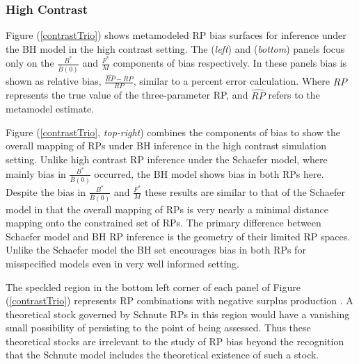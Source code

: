 \subsubsection{High Contrast \label{highConRes}}

%
Figure (\ref{contrastTrio}) shows metamodeled RP bias surfaces for inference
under the BH model in the high contrast setting. The (\emph{left}) and
(\emph{bottom}) panels focus only on the $\frac{B^*}{\bar B(0)}$ and
$\frac{F^*}{M}$ components of bias respectively. In these panels bias is shown
as relative bias, $\frac{\widehat{RP}-RP}{RP}$, similar to a percent error calculation.
Where $RP$ represents the true value of the three-parameter RP, and $\widehat{RP}$ 
refers to the metamodel estimate.

%
Figure (\ref{contrastTrio}, \emph{top-right}) combines the components of bias to
show the overall mapping of RPs under BH inference in the high contrast
simulation setting. Unlike high contrast RP inference under the Schaefer model,
where mainly bias in $\frac{B^*}{\bar B(0)}$ occurred, the BH model shows
bias in both RPs here. Despite the bias in $\frac{B^*}{\bar B(0)}$ and
$\frac{F^*}{M}$ these results are similar to that of the Schaefer model in
that the overall mapping of RPs is very nearly a minimal distance mapping onto
the constrained set of RPs. %
The primary difference between Schaefer model and BH RP inference is the
geometry of their limited RP spaces. Unlike the Schaefer model the BH set
encourages bias in both RPs for misspecified models even in very well informed
setting.

%
The speckled region in the bottom left corner of each panel of Figure (\ref{contrastTrio}) 
represents RP combinations with negative surplus production \cite{myers_maximum_1999, punt_extending_2019}. 
A theoretical stock governed by Schnute RPs in this region would have a 
vanishing small possibility of persisting to the point of being assessed. 
Thus these theoretical stocks are irrelevant to the study of RP bias beyond 
the recognition that the Schnute model includes the theoretical existence of 
such a stock.  


%


